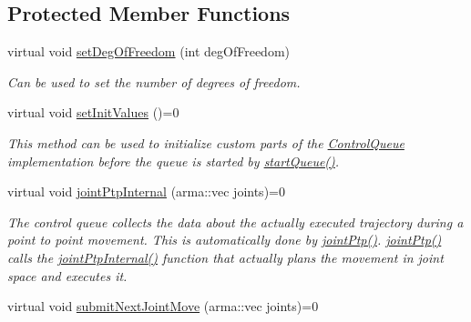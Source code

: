 \subsection*{Protected Member Functions}
\begin{DoxyCompactItemize}
\item 
\hypertarget{classkukadu_1_1ControlQueue_ac38a2bac4927cf5d424e735af703f199}{virtual void \hyperlink{classkukadu_1_1ControlQueue_ac38a2bac4927cf5d424e735af703f199}{set\-Deg\-Of\-Freedom} (int deg\-Of\-Freedom)}\label{classkukadu_1_1ControlQueue_ac38a2bac4927cf5d424e735af703f199}

\begin{DoxyCompactList}\small\item\em Can be used to set the number of degrees of freedom. \end{DoxyCompactList}\item 
\hypertarget{classkukadu_1_1ControlQueue_a743fbc08007b777393a6f14d66ed2e8a}{virtual void \hyperlink{classkukadu_1_1ControlQueue_a743fbc08007b777393a6f14d66ed2e8a}{set\-Init\-Values} ()=0}\label{classkukadu_1_1ControlQueue_a743fbc08007b777393a6f14d66ed2e8a}

\begin{DoxyCompactList}\small\item\em This method can be used to initialize custom parts of the \hyperlink{classkukadu_1_1ControlQueue}{Control\-Queue} implementation before the queue is started by \hyperlink{classkukadu_1_1ControlQueue_a35d6a6e4e7c8467691c11567fe21f340}{start\-Queue()}. \end{DoxyCompactList}\item 
\hypertarget{classkukadu_1_1ControlQueue_a89a7b21307ccd0759a9e8b8e483cb919}{virtual void \hyperlink{classkukadu_1_1ControlQueue_a89a7b21307ccd0759a9e8b8e483cb919}{joint\-Ptp\-Internal} (arma\-::vec joints)=0}\label{classkukadu_1_1ControlQueue_a89a7b21307ccd0759a9e8b8e483cb919}

\begin{DoxyCompactList}\small\item\em The control queue collects the data about the actually executed trajectory during a point to point movement. This is automatically done by \hyperlink{classkukadu_1_1ControlQueue_ad11059100321b24a1af8ef7de8314353}{joint\-Ptp()}. \hyperlink{classkukadu_1_1ControlQueue_ad11059100321b24a1af8ef7de8314353}{joint\-Ptp()} calls the \hyperlink{classkukadu_1_1ControlQueue_a89a7b21307ccd0759a9e8b8e483cb919}{joint\-Ptp\-Internal()} function that actually plans the movement in joint space and executes it. \end{DoxyCompactList}\item 
\hypertarget{classkukadu_1_1ControlQueue_a12166afa17d758aa6b43362fc999e146}{virtual void \hyperlink{classkukadu_1_1ControlQueue_a12166afa17d758aa6b43362fc999e146}{submit\-Next\-Joint\-Move} (arma\-::vec joints)=0}\label{classkukadu_1_1ControlQueue_a12166afa17d758aa6b43362fc999e146}


\end{DoxyCompactItemize}
